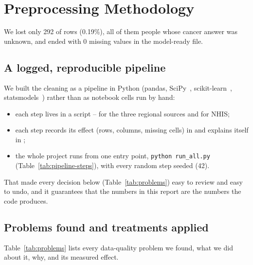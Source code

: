 \section{Preprocessing Methodology}\label{sec:prep}

We lost only 292 of \nRawRows rows (0.19\%), all of them people whose cancer answer was unknown, and ended with 0 missing values in the model-ready file.

\subsection{A logged, reproducible pipeline}\label{sec:pipeline}

We built the cleaning as a pipeline in Python (pandas, SciPy~\cite{scipy}, scikit-learn~\cite{sklearn}, statsmodels~\cite{statsmodels}) rather than as notebook cells run by hand:
\begin{itemize}
  \item each step lives in a script --  for the three regional sources and  for NHIS;
  \item each step records its effect (rows, columns, missing cells) in  and explains itself in ;
  \item the whole project runs from one entry point, \texttt{python run\_all.py} (Table~\ref{tab:pipeline-steps}), with every random step seeded (42).
\end{itemize}
That made every decision below (Table~\ref{tab:problems}) easy to review and easy to undo, and it guarantees that the numbers in this report are the numbers the code produces.

\subsection{Problems found and treatments applied}\label{sec:problems}

Table~\ref{tab:problems} lists every data-quality problem we found, what we did about it, why, and its measured effect.

